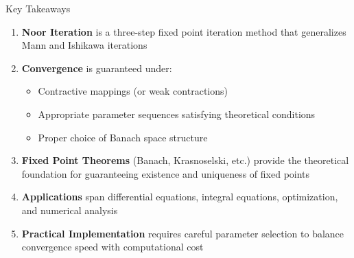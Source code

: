 \documentclass[aspectratio=169,10pt]{beamer}
\begin{document}
\begin{frame}{Key Takeaways}

\begin{enumerate}
  \item \textbf{Noor Iteration} is a three-step fixed point iteration method that generalizes Mann and Ishikawa iterations

  \vspace{0.2cm}

  \item \textbf{Convergence} is guaranteed under:
  \begin{itemize}
    \item Contractive mappings (or weak contractions)
    \item Appropriate parameter sequences satisfying theoretical conditions
    \item Proper choice of Banach space structure
  \end{itemize}

  \vspace{0.2cm}

  \item \textbf{Fixed Point Theorems} (Banach, Krasnoselski, etc.) provide the theoretical foundation for guaranteeing existence and uniqueness of fixed points

  \vspace{0.2cm}

  \item \textbf{Applications} span differential equations, integral equations, optimization, and numerical analysis

  \vspace{0.2cm}

  \item \textbf{Practical Implementation} requires careful parameter selection to balance convergence speed with computational cost

\end{enumerate}

\end{frame}
\end{document}
